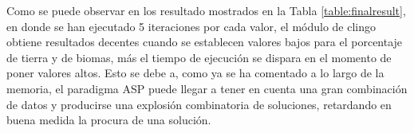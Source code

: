 Como se puede observar en los resultado mostrados en la Tabla \ref{table:finalresult}, en donde se han ejecutado 5 iteraciones por cada valor, el módulo de clingo obtiene resultados decentes cuando se establecen valores bajos para el porcentaje de tierra y de biomas, más el tiempo de ejecución se dispara en el momento de poner valores altos. Esto se debe a, como ya se ha comentado a lo largo de la memoria, el paradigma ASP puede llegar a tener en cuenta una gran combinación de datos y producirse una explosión combinatoria de soluciones, retardando en buena medida la procura de una solución.
